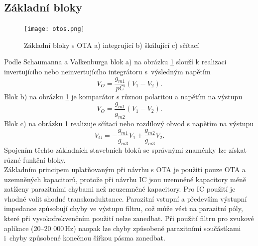 \subsection{Základní bloky}
\begin{figure}[h]
\centering
\texttt{[image: otos.png]}
\caption[Základní bloky s OTA]{Základní bloky s OTA a) integrující b) škálující c) sčítací \label{s:BLO}}
\end{figure}
\noindent Podle Schaumanna a Valkenburga \cite{13} blok a) na obrázku \ref{s:BLO} slouží k realizaci invertujícího nebo neinvertujícího integrátoru s~výsledným napětím
\begin{equation}
V_O = \frac{g_{m1}}{pC}(V_1 - V_2).
\end{equation}
Blok b) na obrázku \ref{s:BLO} je komparátor s různou polaritou a napětím na výstupu
\begin{equation}
V_O = \frac{g_{m1}}{g_{m2}}(V_1 - V_2).
\end{equation}
Blok c) na obrázku \ref{s:BLO} realizuje sčítací nebo rozdílový obvod s napětím na výstupu
\begin{equation}
V_O = -\frac{g_{m1}}{g_{m3}}V_1 + \frac{g_{m2}}{g_{m3}}V_2.\label{s:BLO3}
\end{equation}
\noindent Spojením těchto základních stavebních bloků se správnými znaménky lze získat různé funkční bloky.\\
Základním principem uplatňovaným při návrhu s OTA je použití pouze OTA a uzemněných kapacitorů, protože při návrhu IC jsou uzemněné kapacitory méně zatíženy parazitními chybami než neuzemněné kapacitory. Pro IC použití je vhodné volit shodné transkonduktance. Parazitní vstupní a především výstupní impedance způsobují chyby ve výstupu filtru, což může vést na parazitní póly, které při vysokofrekvenčním použití nelze zanedbat. Při použití filtru pro zvukové aplikace (20--20 000\,Hz) naopak lze chyby způsobené parazitními součástkami i~chyby způsobené konečnou šířkou pásma zanedbat.
